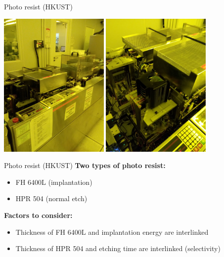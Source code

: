 \documentclass[9pt]{beamer}
\begin{document}
\begin{frame}{Photo resist (HKUST)}
\begin{center}
\includegraphics[width=0.4\textwidth]{images/20181128_154907.jpg}
\includegraphics[width=0.4\textwidth]{images/20181128_154911.jpg}
\end{center}
\end{frame}

\begin{frame}{Photo resist (HKUST)}
	\textbf{Two types of photo resist:}
	\begin{itemize}
		\item FH 6400L (implantation)
		\item HPR 504 (normal etch)
	\end{itemize}

	\textbf{Factors to consider:}
	\begin{itemize}
		\item Thickness of FH 6400L and implantation energy are interlinked
		\item Thickness of HPR 504 and etching time are interlinked (selectivity)
	\end{itemize}
\end{frame}
\end{document}
